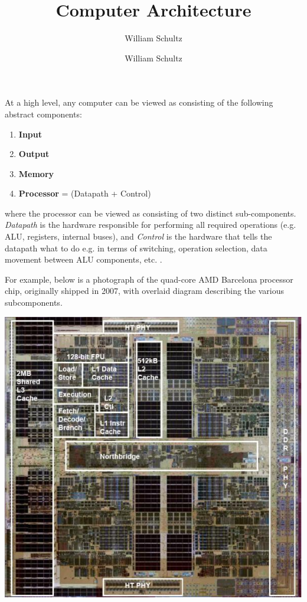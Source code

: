 \documentclass[10pt,a4paper]{article}
\author{William Schultz}
\begin{document}
\title{Computer Architecture}
\author{William Schultz}
\maketitle

At a high level, any computer can be viewed as consisting of the following abstract components:
\begin{enumerate}
    \item \textbf{Input}
    \item \textbf{Output}
    \item \textbf{Memory}
    \item \textbf{Processor} = (Datapath + Control)
\end{enumerate}
 where the processor can be viewed as consisting of two distinct sub-components. \textit{Datapath} is the hardware responsible for performing all required operations (e.g. ALU, registers, internal buses), and \textit{Control} is the hardware that tells the datapath what to do e.g. in terms of switching, operation selection, data movement between ALU components, etc. \cite{2011fourthcomporgdesign}.

 For example, below is a photograph of the quad-core AMD Barcelona processor chip, originally shipped in 2007, with overlaid diagram describing the various subcomponents.

\begin{center}
\includegraphics[scale=0.4]{images/amd_barcelona_die.png}
\end{center}
\end{document}
